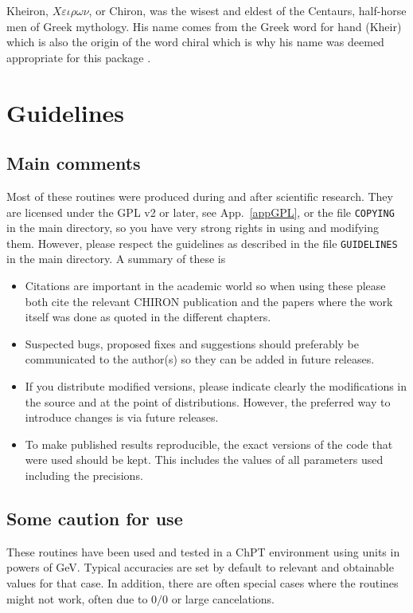 \documentclass[12pt,a4paper]{article}
\newcommand{\mytt}[1]{\texttt{#1}}
\begin{document}
Kheiron, $X\varepsilon\iota\rho\omega\nu$, or Chiron, was the wisest
and eldest of the Centaurs, half-horse men of Greek mythology.
His name comes from the Greek word for hand (Kheir)
which is also the origin of the word chiral which is why his name was deemed
appropriate for this package \cite{chiron}.

\section{Guidelines}
\label{guidelines}

\subsection{Main comments}

Most of these routines were produced during and after scientific research.
They are licensed under the GPL v2 or later, see App.~\ref{appGPL}, \cite{GPLv2}
or the file \mytt{COPYING} in the main directory, so you have very strong rights
in using and modifying them. However, please respect the guidelines as described
in the file \mytt{GUIDELINES} in the main directory. A summary of these
is
\begin{itemize}
\item Citations are important in the academic world so when using
these please both cite the relevant \textsc{CHIRON} publication
\cite{Bijnens:2014gsa} and the papers where the work itself was done
as quoted in the different chapters.
\item Suspected bugs, proposed fixes and suggestions should preferably be
communicated to the author(s) so they can be added in future releases.
\item If you distribute modified versions, please indicate clearly the
modifications in the source and at the point of distributions. However,
the preferred way to introduce changes is via future releases.
\item To make published results reproducible, the exact versions of the code
that were used should be kept. This includes the values of all parameters
used including the precisions.
\end{itemize}

\subsection{Some caution for use}

These routines have been used and tested in a ChPT environment using
units in powers of GeV. Typical accuracies are set by default to relevant
and obtainable values for that case. In addition, there are often special cases
where the routines might not work, often due to $0/0$ or large cancelations.
\end{document}
